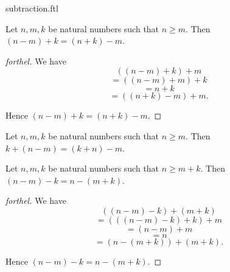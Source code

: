 \documentclass{naproche-library}
\begin{document}
\begin{smodule}[title=Subtraction]{subtraction.ftl}
\begin{proposition}[forthel,id=ARITHMETIC_05_4767595811045376]
  Let $n, m, k$ be natural numbers such that $n \geq m$.
  Then $(n - m) + k = (n + k) - m$.
\end{proposition}
\begin{proof}[forthel]
  We have
  \[  ((n - m) + k) + m       \]
  \[    = ((n - m) + m) + k   \]
  \[    = n + k               \]
  \[    = ((n + k) - m) + m.  \]

  Hence $(n - m) + k = (n + k) - m$.
\end{proof}

\begin{corollary}[forthel,id=ARITHMETIC_05_7578468875239424]
  Let $n, m, k$ be natural numbers such that $n \geq m$.
  Then $k + (n - m) = (k + n) - m$.
\end{corollary}

\begin{proposition}[forthel,id=ARITHMETIC_05_7595909347016704]
  Let $n, m, k$ be natural numbers such that $n \geq  m + k$.
  Then $(n - m) - k = n - (m + k)$.
\end{proposition}
\begin{proof}[forthel]
  We have
  \[  ((n - m) - k) + (m + k)       \]
  \[    = (((n - m) - k) + k) + m   \]
  \[    = (n - m) + m               \]
  \[    = n                         \]
  \[    = (n - (m + k)) + (m + k).  \]

  Hence $(n - m) - k = n - (m + k)$.
\end{proof}
\end{smodule}
\end{document}
